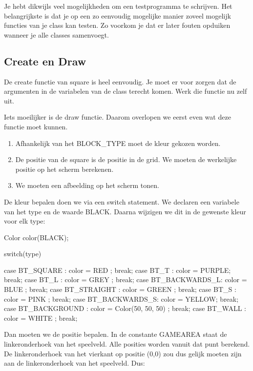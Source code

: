 \begin{note}
Je hebt dikwijls veel mogelijkheden om een testprogramma te schrijven. Het belangrijkste is dat je op een zo eenvoudig mogelijke manier zoveel mogelijk functies van je class kan testen. Zo voorkom je dat er later fouten opduiken wanneer je alle classes samenvoegt.
\end{note}

\subsection{Create en Draw}
De create functie van square is heel eenvoudig. Je moet er voor zorgen dat de argumenten in de variabelen van de class terecht komen. Werk die functie nu zelf uit.

Iets moeilijker is de draw functie. Daarom overlopen we eerst even wat deze functie moet kunnen.

\begin{enumerate}
  \item Afhankelijk van het BLOCK\_TYPE moet de kleur gekozen worden. 
	\item De positie van de square is de positie in de grid. We moeten de werkelijke positie op het scherm berekenen.
	\item We moeten een afbeelding op het scherm tonen.
\end{enumerate}

De kleur bepalen doen we via een switch statement. We declaren een variabele van het type  en de waarde BLACK. Daarna wijzigen we dit in de gewenste kleur voor elk type:

\begin{code}
Color color(BLACK);
      
switch(type)
{

case BT_SQUARE     : color = RED   ; break;
	 case BT_T          : color = PURPLE; break;
	 case BT_L          : color = GREY  ; break;
	 case BT_BACKWARDS_L: color = BLUE  ; break;
	 case BT_STRAIGHT   : color = GREEN ; break;
	 case BT_S          : color = PINK  ; break;
	 case BT_BACKWARDS_S: color = YELLOW; break;
	 case BT_BACKGROUND : color = Color(50, 50, 50) ; break;
	 case BT_WALL       : color = WHITE ; break;
}
\end{code}

Dan moeten we de positie bepalen. In de constante GAMEAREA staat de linkeronderhoek van het speelveld. Alle posities worden vanuit dat punt berekend. De linkeronderhoek van het vierkant op positie (0,0) zou dus gelijk moeten zijn aan de linkeronderhoek van het speelveld. Dus:

